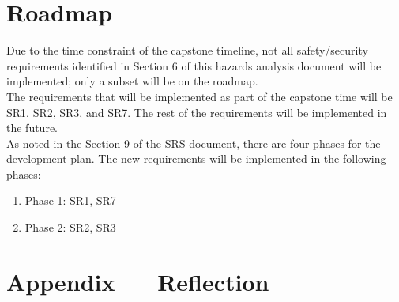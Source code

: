 \documentclass{article}
\begin{document}
\section{Roadmap}

Due to the time constraint of the capstone timeline, not all safety/security
requirements identified in Section 6 of this hazards analysis document will be
implemented; only a subset will be on the roadmap.\\

\noindent The requirements that will be implemented as part of the capstone time
will be SR1, SR2, SR3, and SR7. The rest of the requirements will be implemented
in the future.\\

As noted in the Section 9 of the \href{https://github.com/PlutosCapstone/Plutos/blob/main/docs/SRS/SRS.pdf}{SRS document}, there are four phases for the
development plan. The new requirements will be implemented in the following phases:
\begin{enumerate}
    \item Phase 1: SR1, SR7
    \item Phase 2: SR2, SR3
\end{enumerate}



\newpage{}

\section*{Appendix --- Reflection}


\end{document}
